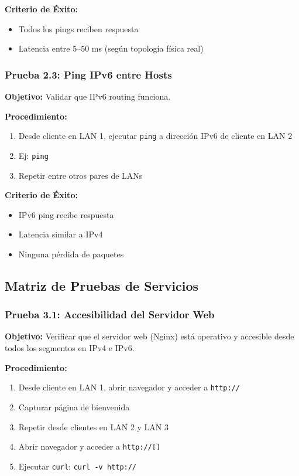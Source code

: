 \textbf{Criterio de Éxito:}
\begin{itemize}
\item Todos los pings reciben respuesta
\item Latencia entre 5--50 ms (según topología física real)
\end{itemize}


\subsubsection{Prueba 2.3: Ping IPv6 entre Hosts}

\textbf{Objetivo:} Validar que IPv6 routing funciona.

\textbf{Procedimiento:}
\begin{enumerate}
\item Desde cliente en LAN 1, ejecutar \texttt{ping} a dirección IPv6 de cliente en LAN 2
\item Ej: \texttt{ping \ipHostIpvSeisLanDos}
\item Repetir entre otros pares de LANs
\end{enumerate}

\textbf{Criterio de Éxito:}
\begin{itemize}
\item IPv6 ping recibe respuesta
\item Latencia similar a IPv4
\item Ninguna pérdida de paquetes
\end{itemize}


\subsection{Matriz de Pruebas de Servicios}

\subsubsection{Prueba 3.1: Accesibilidad del Servidor Web}

\textbf{Objetivo:} Verificar que el servidor web (Nginx) está operativo y accesible
desde todos los segmentos en IPv4 e IPv6.

\textbf{Procedimiento:}
\begin{enumerate}
\item Desde cliente en LAN 1, abrir navegador y acceder a \texttt{http://\ipServidorWeb}
\item Capturar página de bienvenida
\item Repetir desde clientes en LAN 2 y LAN 3
\item Abrir navegador y acceder a \texttt{http://[\ipServidorWebIpvSeis]}
\item Ejecutar \texttt{curl}: \texttt{curl -v http://\ipServidorWeb}
\end{enumerate}

